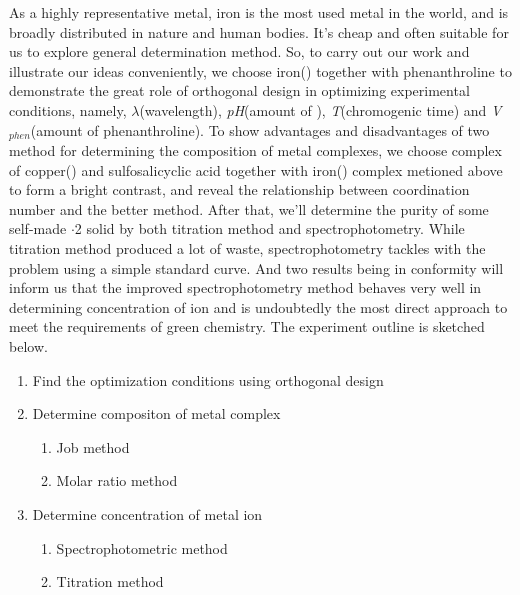 As a highly representative metal, iron is the most used metal in the world, and is broadly distributed in nature and human bodies. It's cheap and often suitable for us to explore general determination method.
So, to carry out our work and illustrate our ideas conveniently, we choose iron(\uppercase\expandafter{}) together with phenanthroline to demonstrate the great role of orthogonal design in optimizing experimental conditions, namely, $\lambda$(wavelength), \emph{pH}(amount of ), \emph{T}(chromogenic time) and \emph{V$_{phen}$}(amount of phenanthroline).
To show advantages and disadvantages of two method for determining the composition of metal complexes, we choose complex of copper(\uppercase\expandafter{}) and sulfosalicyclic acid together with iron(\uppercase\expandafter{}) complex metioned above to form a bright contrast, and reveal the relationship between coordination number and the better method.
After that, we'll determine the purity of some self-made $\cdot$2 solid by both titration method and spectrophotometry. While titration method produced a lot of waste, spectrophotometry tackles with the problem using a simple standard curve. And two results being in conformity will inform us that the improved spectrophotometry method behaves very well in determining concentration of ion and is undoubtedly the most direct approach to meet the requirements of green chemistry. The experiment outline is sketched below.
\begin{enumerate}
    \item Find the optimization conditions using orthogonal design
    \item Determine compositon of metal complex
    \begin{enumerate}
        \item Job method
        \item Molar ratio method
    \end{enumerate}
    \item Determine concentration of metal ion
    \begin{enumerate}
        \item Spectrophotometric method
        \item Titration method
    \end{enumerate}
\end{enumerate}


\ifx\SUM\undefined


\fi